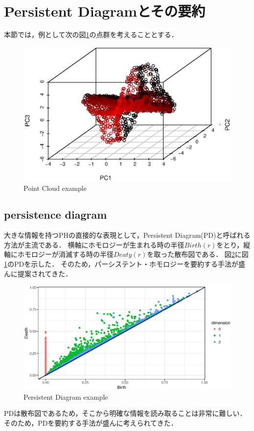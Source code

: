 \documentclass{jarticle}
\begin{document}
\section{Persistent Diagramとその要約}


本節では，例として次の図\ref{fig:PCex}の点群を考えることとする．
\begin{figure}[H]
	\begin{center}
		\includegraphics[width=15cm]{fig/PC_example.eps}
		\caption{Point Cloud example}
		\label{fig:PCex}
	\end{center}	
\end{figure}


\subsection{persistence diagram}
大きな情報を持つPHの直接的な表現として，Persistent Diagram(PD)と呼ばれる方法が主流である．
横軸にホモロジーが生まれる時の半径$Birth(r)$をとり，縦軸にホモロジーが消滅する時の半径$Deaty(r)$を取った散布図である．
図\ref{fig:PDex}に図\ref{fig:PCex}のPDを示した．
そのため，パーシステント・ホモロジーを要約する手法が盛んに提案されてきた．
\begin{figure}[H]
	\begin{center}
		\includegraphics[width=12cm]{fig/PD_example.eps}
		\caption{Persistent Diagram example}
		\label{fig:PDex}
	\end{center}
\end{figure}
PDは散布図であるため，そこから明確な情報を読み取ることは非常に難しい．
そのため，PDを要約する手法が盛んに考えられてきた．
\end{document}
